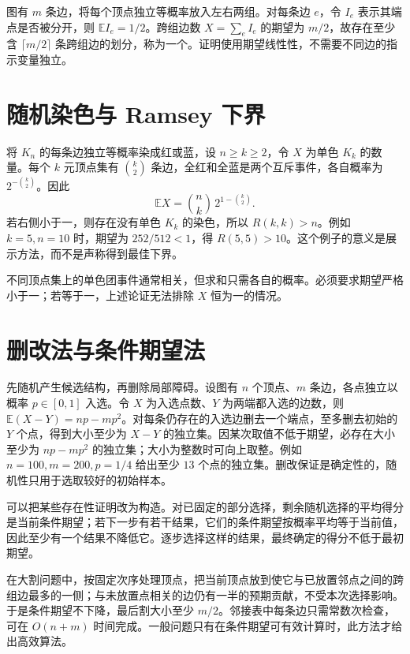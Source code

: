 \documentclass[UTF8,12pt,a4paper,fontset=fandol]{ctexbook}
\begin{document}
\begin{example}[大割的存在]
图有 $m$ 条边，将每个顶点独立等概率放入左右两组。对每条边 $e$，令 $I_e$ 表示其端点是否被分开，则 $\mathbb E I_e=1/2$。跨组边数 $X=\sum_eI_e$ 的期望为 $m/2$，故存在至少含 $\lceil m/2\rceil$ 条跨组边的划分，称为一个。证明使用期望线性性，不需要不同边的指示变量独立。
\end{example}

\section{随机染色与 Ramsey 下界}

将 $K_n$ 的每条边独立等概率染成红或蓝，设 $n\ge k\ge2$，令 $X$ 为单色 $K_k$ 的数量。每个 $k$ 元顶点集有 $\binom k2$ 条边，全红和全蓝是两个互斥事件，各自概率为 $2^{-\binom k2}$。因此
\begin{equation}
 \mathbb E X=\binom nk\,2^{1-\binom k2}.
 \label{eq:ramsey-first-moment}
\end{equation}
若右侧小于一，则存在没有单色 $K_k$ 的染色，所以 $R(k,k)>n$。例如 $k=5,n=10$ 时，期望为 $252/512<1$，得 $R(5,5)>10$。这个例子的意义是展示方法，而不是声称得到最佳下界。

不同顶点集上的单色团事件通常相关，但求和只需各自的概率。必须要求期望严格小于一；若等于一，上述论证无法排除 $X$ 恒为一的情况。

\section{删改法与条件期望法}

先随机产生候选结构，再删除局部障碍。设图有 $n$ 个顶点、$m$ 条边，各点独立以概率 $p\in[0,1]$ 入选。令 $X$ 为入选点数、$Y$ 为两端都入选的边数，则 $\mathbb E(X-Y)=np-mp^2$。对每条仍存在的入选边删去一个端点，至多删去初始的 $Y$ 个点，得到大小至少为 $X-Y$ 的独立集。因某次取值不低于期望，必存在大小至少为 $np-mp^2$ 的独立集；大小为整数时可向上取整。例如 $n=100,m=200,p=1/4$ 给出至少 $13$ 个点的独立集。删改保证是确定性的，随机性只用于选取较好的初始样本。

可以把某些存在性证明改为构造。对已固定的部分选择，剩余随机选择的平均得分是当前条件期望；若下一步有若干结果，它们的条件期望按概率平均等于当前值，因此至少有一个结果不降低它。逐步选择这样的结果，最终确定的得分不低于最初期望。

在大割问题中，按固定次序处理顶点，把当前顶点放到使它与已放置邻点之间的跨组边最多的一侧；与未放置点相关的边仍有一半的预期贡献，不受本次选择影响。于是条件期望不下降，最后割大小至少 $m/2$。邻接表中每条边只需常数次检查，可在 $O(n+m)$ 时间完成。一般问题只有在条件期望可有效计算时，此方法才给出高效算法。
\end{document}
